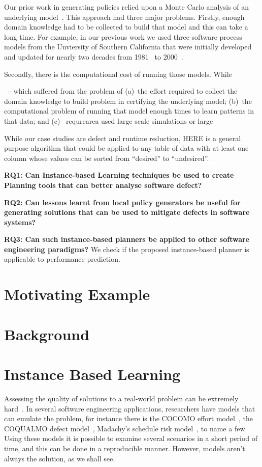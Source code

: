 \documentclass[conference]{IEEEtran}
\begin{document}
Our prior work in generating policies relied upon a Monte Carlo
analysis of an underlying model~\cite{me07f}. This approach had three major problems.
Firstly, enough domain knowledge had to be collected to build that model
and this can take a long time. For example, in our previous work we used three software process models from
the Unviersity of Southern California that were initially
developed and updated for nearly two decades from 1981~\cite{boehm81} to 2000~\cite{boehm00b}.

Secondly, there is the computational cost of running those models.
While 

~\cite{}-- which suffered from the problem of (a)~the effort required to collect the domain knowledge to build
problem in certifying the underlying model;
 (b)~the computational problem of running that model enough
times to learn patterns in that data; and (c)~ requrearea used large scale simulations or large


While
our case studies are defect and runtime reduction, HERE is a general
purpose algorithm that could be applied to any table of data with at least
one column whose values can be sorted from ``desired'' to ``undesired''.



{\bf RQ1: Can Instance-based Learning techniques be used to create Planning tools that can better analyse software defect?} 


{\bf RQ2: Can lessons learnt from local policy generators be useful for generating solutions that can be used to mitigate defects in software systems?} 

{\bf RQ3: Can such instance-based planners be applied to other software engineering paradigms?}
We check if the proposed instance-based planner is applicable to performance prediction.

\section{Motivating Example}
\section{Background}
\section{Instance Based Learning}

Assessing the quality of solutions to a real-world problem can be extremely hard~\cite{menzies2005xomo}. In several software engineering applications, researchers have models that can emulate the problem, for instance there is the COCOMO effort model~\cite[p29-57]{boehm2009software}, the COQUALMO defect model~\cite[p254-268]{boehm2009software}, Madachy’s schedule risk model~\cite[p284-291]{boehm2009software}, to name a few. Using these models it is possible to examine several scenarios in a short period of time, and this can be done in a reproducible manner. However, models aren't always the solution, as we shall see. 
\end{document}
